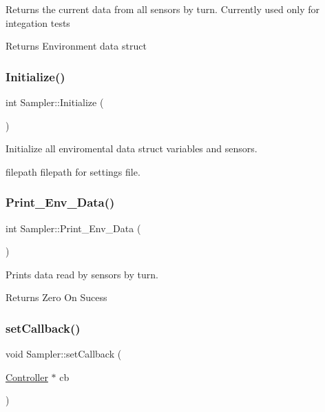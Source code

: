 Returns the current data from all sensors by turn. Currently used only for integation tests

\begin{DoxyReturn}{Returns}
Environment data struct 
\end{DoxyReturn}
\mbox{\label{classSampler_a1aed5b32bf99312ba38d092f1acad3d9}} 
\subsubsection{\texorpdfstring{Initialize()}{Initialize()}}
{\footnotesize\ttfamily int Sampler\+::\+Initialize (\begin{DoxyParamCaption}{ }\end{DoxyParamCaption})\hspace{0.3cm}{\ttfamily [private]}}

Initialize all enviromental data struct variables and sensors.

filepath filepath for settings file. \mbox{\label{classSampler_acf3d04a740356e54fe53766a7f00ae15}} 
\subsubsection{\texorpdfstring{Print\+\_\+\+Env\+\_\+\+Data()}{Print\_Env\_Data()}}
{\footnotesize\ttfamily int Sampler\+::\+Print\+\_\+\+Env\+\_\+\+Data (\begin{DoxyParamCaption}{ }\end{DoxyParamCaption})\hspace{0.3cm}{\ttfamily [private]}}

Prints data read by sensors by turn.

\begin{DoxyReturn}{Returns}
Zero On Sucess 
\end{DoxyReturn}
\mbox{\label{classSampler_a026a0839919e8e93fa75f19b67ccffc6}} 
\subsubsection{\texorpdfstring{set\+Callback()}{setCallback()}}
{\footnotesize\ttfamily void Sampler\+::set\+Callback (\begin{DoxyParamCaption}\item[{\hyperlink{classController}{Controller} $\ast$}]{cb }\end{DoxyParamCaption})\hspace{0.3cm}{\ttfamily [inline]}}

